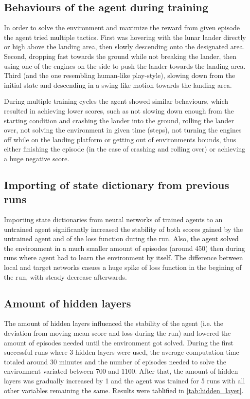 \documentclass{article}
\begin{document}
\subsection*{Behaviours of the agent during training}
In order to solve the environment and maximize the reward from given episode the agent tried multiple tactics. First was hovering with the lunar lander directly or high above the landing area, then slowly descending onto the designated area. Second, dropping fast towards the ground while not breaking the lander, then using one of the engines on the side to push the lander towards the landing area. Third (and the one resembling human-like play-style), slowing down from the initial state and descending in a swing-like motion towards the landing area.

During multiple training cycles the agent showed similar behaviours, which resulted in achieving lower scores, such as not slowing down enough from the starting condition and crashing the lander into the ground, rolling the lander over, not solving the environment in given time (steps), not turning the engines off while on the landing platform or getting out of environments bounds, thus either finishing the episode (in the case of crashing and rolling over) or achieving a huge negative score.

\subsection*{Importing of state dictionary from previous runs}
Importing state dictionaries from neural networks of trained agents to an untrained agent significantly increased the stability of both scores gained by the untrained agent and of the loss function during the run. Also, the agent solved the environment in a much smaller amount of episodes (around 450) then during runs where agent had to learn the environment by itself. The difference between local and target networks casues a huge spike of loss function in the begining of the run, with steady decrease afterwards.

\subsection*{Amount of hidden layers}
The amount of hidden layers influenced the stability of the agent (i.e. the deviation from moving mean score and loss during the run) and lowered the amount of episodes needed until the environment got solved. During the first successful runs where 3 hidden layers were used, the average computation time totaled around 30 minutes and the number of episodes needed to solve the environment variated between 700 and 1100. After that, the amount of hidden layers was gradually increased by 1 and the agent was trained for 5 runs with all other variables remaining the same. Results were tablified in \ref{tab:hidden_layer}.
\end{document}
